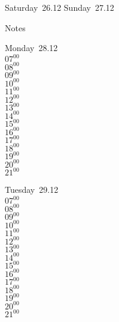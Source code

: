 \documentclass[11pt,a4paper]{book}\usepackage[]{graphicx}\usepackage[]{color}
\begin{document}
\begin{weekendbox}
  Saturday~26.12
  \tcblower
  Sunday~27.12
\end{weekendbox} %
\begin{notebox}
  Notes
\end{notebox}
\clearpage
\begin{headerbox}
\end{headerbox}
\begin{weekdaybox}
  Monday~28.12\\
  { 
  \vfill
  $07^{00}$\\
$08^{00}$\\
$09^{00}$\\
$10^{00}$\\
$11^{00}$\\
$12^{00}$\\
$13^{00}$\\
$14^{00}$\\
$15^{00}$\\
$16^{00}$\\
$17^{00}$\\
$18^{00}$\\
$19^{00}$\\
$20^{00}$\\
$21^{00}$\\
  }
\end{weekdaybox}
\begin{weekdaybox}
  Tuesday~29.12\\
  { 
  \vfill
  $07^{00}$\\
$08^{00}$\\
$09^{00}$\\
$10^{00}$\\
$11^{00}$\\
$12^{00}$\\
$13^{00}$\\
$14^{00}$\\
$15^{00}$\\
$16^{00}$\\
$17^{00}$\\
$18^{00}$\\
$19^{00}$\\
$20^{00}$\\
$21^{00}$\\
  }
\end{weekdaybox}
\end{document}
